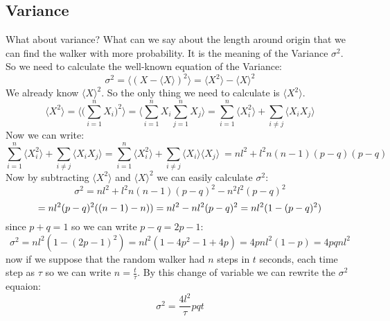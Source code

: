\documentclass[12pt,a4paper]{article}
\begin{document}
\subsection{Variance}
What about variance? What can we say about the length around origin that we can find the walker with more probability. It is the meaning of the Variance $\sigma^{2}$. So we need to calculate the well-known equation of the Variance:
\begin{equation}
\sigma^{2} =\langle(X - \langle X \rangle)^{2}\rangle  = \langle X^{2} \rangle - \langle X \rangle^{2}
\end{equation}
We already know $\langle X\rangle^2$. So the only thing we need to calculate is $\langle X^2 \rangle$.
\begin{equation}
\langle X^2\rangle = \langle\Big(\sum_{i=1}^n X_i\Big)^2\rangle = \langle\sum_{i=1}^n X_i\sum_{j=1}^n X_j\rangle = \sum_{i=1}^n\langle X_i^2\rangle + \sum_{i\neq j}\langle X_iX_j \rangle
\end{equation}
Now we can write:
\begin{equation}
\sum_{i=1}^n\langle X_i^2\rangle + \sum_{i\neq j}\langle X_iX_j \rangle =  \sum_{i=1}^n\langle X_i^2\rangle + \sum_{i\neq j}\langle X_i\rangle \langle X_j \rangle\ = nl^2 + l^2n(n-1)(p-q)(p-q)
\end{equation}
Now by subtracting $\langle X^2 \rangle$ and $\langle X \rangle^2$ we can easily calculate $\sigma ^2$:
\begin{equation}
\sigma^2 = nl^2 + l^2n(n-1)(p-q)^2 - n^2l^2(p-q)^2
\end{equation}
\begin{equation}
=nl^2(p-q)^2((n-1)-n)) \\
=nl^2 - nl^2(p-q)^2 = nl^2(1-(p-q)^2)
\end{equation}
since $p+q=1$ so we can write $p-q=2p-1$:
\begin{equation}
\sigma^2 = nl^2(1-(2p-1)^2) = nl^2(1-4p^2 -1 +4p) = 4pnl^2(1-p) = 4pqnl^2
\end{equation}
now if we suppose that the random walker had $n$ steps in $t$ seconds, each time step as $\tau$ so we can write $n=\frac{t}{\tau}$. By this change of variable we can rewrite the $\sigma^2$ equaion:
\begin{equation}
\sigma^2 = \frac{4l^2}{\tau}pqt
\end{equation}
\end{document}
